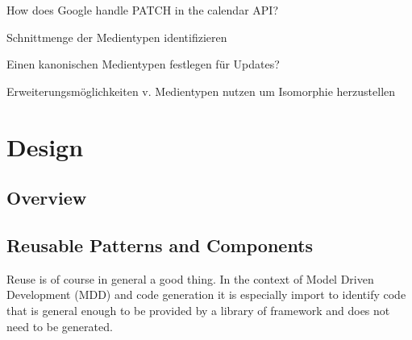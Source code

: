 \documentclass[12pt,a4paper]{scrartcl}		%
\newcommand{\citeurl}[2]{\url{#1} (#2)}
\begin{document}
How does Google handle PATCH in the calendar API?

Schnittmenge der Medientypen identifizieren

Einen kanonischen Medientypen festlegen für Updates?

Erweiterungsmöglichkeiten v. Medientypen nutzen um Isomorphie herzustellen


\section{Design}






\subsection{Overview}

\subsection{Reusable Patterns and Components}

Reuse is of course in general a good thing. In the context of Model Driven
Development (MDD) and code generation it is especially import to identify code
that is general enough to be provided by a library of framework and does not
need to be generated.
\end{document}
